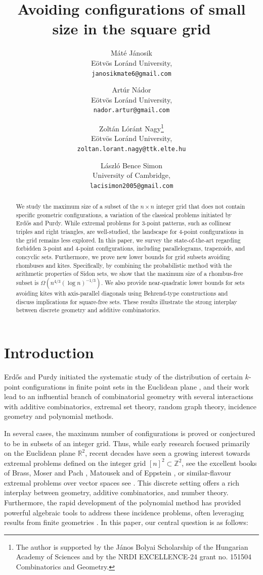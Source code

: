 \documentclass[11pt]{article}
\title{Avoiding  configurations of small size in the square grid}
\author{
	Máté  Jánosik \\
	Eötvös Loránd University,  \\
	\texttt{janosikmate6@gmail.com}
	\and
	Artúr Nádor \\
	Eötvös Loránd University,  \\
	\texttt{nador.artur@gmail.com} 
	\and
	Zoltán Lóránt    Nagy\thanks{The author is supported by the J\'anos Bolyai Scholarship of the Hungarian Academy of Sciences and by the NRDI EXCELLENCE-24 grant no. 151504 Combinatorics and Geometry.} \\
	Eötvös Loránd University,\\ 
	\texttt{zoltan.lorant.nagy@ttk.elte.hu}
	\and
	László Bence   Simon\\
	University of Cambridge, \\
	\texttt{lacisimon2005@gmail.com} 
}
\date{}
\theoremstyle{plain}
\begin{document}
	
	\maketitle
	\begin{abstract}
		We study the maximum size of a subset of the $n \times n$ integer grid that does not contain specific geometric configurations, a variation of the classical problems initiated by Erdős and Purdy. While extremal problems for 3-point patterns, such as collinear triples and right triangles, are well-studied, the landscape for 4-point configurations in the grid remains less explored. In this paper, we survey the state-of-the-art regarding forbidden 3-point and 4-point configurations, including parallelograms, trapezoids, and concyclic sets. Furthermore, we prove new lower bounds for grid subsets avoiding rhombuses and kites. Specifically, by combining the probabilistic method with the arithmetic properties of Sidon sets, we show that the maximum size of a rhombus-free subset is $\Omega(n^{4/3}(\log n)^{-1/3})$. We also provide near-quadratic lower bounds for sets avoiding kites with axis-parallel diagonals using Behrend-type constructions and discuss implications for square-free sets. These results illustrate the strong interplay between discrete geometry and additive combinatorics.
	\end{abstract}
	\section{Introduction}
	
	Erdős and Purdy  initiated the systematic study of   the 
	distribution of certain $k$-point configurations in finite point sets in the Euclidean plane \cite{EP1, EP2}, and  their work lead to an influential branch of combinatorial geometry with several  interactions with additive combinatorics, extremal set theory, random graph theory, incidence geometry and polynomial methods.
	
	In several cases, the maximum number of configurations is proved or conjectured to be in subsets of an integer grid.
	Thus, while early research focused primarily on the Euclidean plane $\mathbb{R}^2$, recent decades have seen a growing interest towards extremal problems defined on the integer grid $[n]^2 \subset \mathbb{Z}^2$, see  the excellent books of Brass, Moser and Pach \cite{research}, Matousek \cite{Mat} and of Eppstein \cite{Epp}, or similar-flavour extremal problems over vector spaces  see \cite{Ben, Io}.
	This discrete setting offers a rich interplay between geometry, additive combinatorics, and number theory. Furthermore, the rapid development of the polynomial method has provided powerful algebraic tools to address these incidence problems, often leveraging results from finite geometries \cite{GuthKatz15, Tao}.
	In this paper, 
	our central question is as follows:
	
\end{document}
